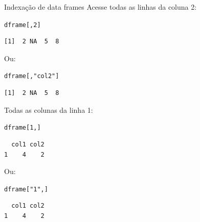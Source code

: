 \documentclass[10pt,handout]{beamer}\usepackage[]{graphicx}\usepackage[]{color}
\makeatletter
\newcommand{\hlnum}[1]{\textcolor[rgb]{0.686,0.059,0.569}{#1}}%
\newcommand{\hlstr}[1]{\textcolor[rgb]{0.192,0.494,0.8}{#1}}%
\newcommand{\hlstd}[1]{\textcolor[rgb]{0.345,0.345,0.345}{#1}}%
\newenvironment{kframe}{%
 \def\at@end@of@kframe{}%
 \ifinner\ifhmode%
  \def\at@end@of@kframe{\end{minipage}}%
  \begin{minipage}{\columnwidth}%
 \fi\fi%
 \def\FrameCommand##1{\hskip\@totalleftmargin \hskip-\fboxsep
 \colorbox{shadecolor}{##1}\hskip-\fboxsep
     \hskip-\linewidth \hskip-\@totalleftmargin \hskip\columnwidth}%
 \MakeFramed {\advance\hsize-\width
   \@totalleftmargin\z@ \linewidth\hsize
   \@setminipage}}%
 {\par\unskip\endMakeFramed%
 \at@end@of@kframe}
\newenvironment{knitrout}{}{} %
\makeatother
\begin{document}
\begin{frame}[fragile]{Indexação de data frames}
Acesse todas as linhas da coluna 2:
\begin{knitrout}\small
{}\color{fgcolor}\begin{kframe}
\begin{alltt}
\hlstd{dframe[,}\hlnum{2}\hlstd{]}
\end{alltt}
\begin{verbatim}
[1]  2 NA  5  8
\end{verbatim}
\end{kframe}
\end{knitrout}
Ou:
\begin{knitrout}\small
{}\color{fgcolor}\begin{kframe}
\begin{alltt}
\hlstd{dframe[,}\hlstr{"col2"}\hlstd{]}
\end{alltt}
\begin{verbatim}
[1]  2 NA  5  8
\end{verbatim}
\end{kframe}
\end{knitrout}
Todas as colunas da linha 1:
\begin{knitrout}\small
{}\color{fgcolor}\begin{kframe}
\begin{alltt}
\hlstd{dframe[}\hlnum{1}\hlstd{,]}
\end{alltt}
\begin{verbatim}
  col1 col2
1    4    2
\end{verbatim}
\end{kframe}
\end{knitrout}
Ou:
\begin{knitrout}\small
{}\color{fgcolor}\begin{kframe}
\begin{alltt}
\hlstd{dframe[}\hlstr{"1"}\hlstd{,]}
\end{alltt}
\begin{verbatim}
  col1 col2
1    4    2
\end{verbatim}
\end{kframe}
\end{knitrout}
\end{frame}
\end{document}

